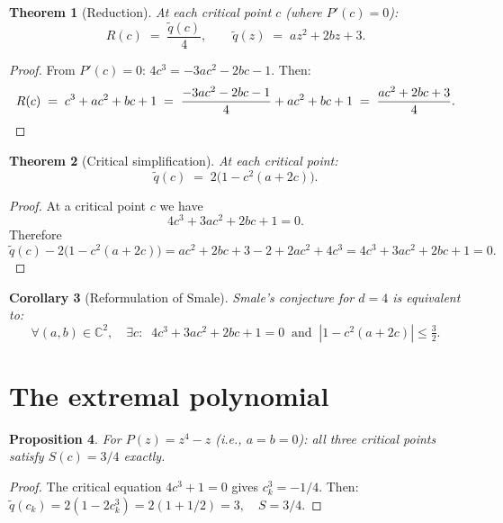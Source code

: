 \documentclass[11pt,a4paper]{article}
\newtheorem{theorem}{Theorem}[section]
\newtheorem{proposition}[theorem]{Proposition}
\newtheorem{corollary}[theorem]{Corollary}
\begin{document}
\begin{theorem}[Reduction]\label{thm:reduction}
At each critical point $c$ (where $P'(c) = 0$):
\begin{equation}
\boxed{R(c) \;=\; \frac{\tilde{q}(c)}{4}, \qquad \tilde{q}(z) \;=\; az^2 + 2bz + 3.}
\end{equation}
\end{theorem}

\begin{proof}
From $P'(c) = 0$: $4c^3 = -3ac^2 - 2bc - 1$. Then:
\begin{equation*}
R(c) \;=\; c^3 + ac^2 + bc + 1 \;=\; \frac{-3ac^2 - 2bc - 1}{4} + ac^2 + bc + 1 \;=\; \frac{ac^2 + 2bc + 3}{4}. \qedhere
\end{equation*}
\end{proof}

\begin{theorem}[Critical simplification]
At each critical point:
\begin{equation}
\tilde{q}(c) \;=\; 2\bigl(1 - c^2(a + 2c)\bigr).
\end{equation}
\end{theorem}

\begin{proof}
At a critical point $c$ we have
\[
4c^3+3ac^2+2bc+1=0.
\]
Therefore
\[
\tilde q(c)-2\bigl(1-c^2(a+2c)\bigr)
=ac^2+2bc+3-2+2ac^2+4c^3
=4c^3+3ac^2+2bc+1=0.
\]
\end{proof}

\begin{corollary}[Reformulation of Smale]
Smale's conjecture for $d = 4$ is equivalent to:
\begin{equation}
\forall (a, b) \in \mathbb{C}^2, \quad \exists c: \;\; 4c^3 + 3ac^2 + 2bc + 1 = 0 \;\; \text{and} \;\; |1 - c^2(a + 2c)| \le \tfrac{3}{2}.
\end{equation}
\end{corollary}

\section{The extremal polynomial}

\begin{proposition}
For $P(z) = z^4 - z$ (i.e., $a = b = 0$): all three critical points satisfy $S(c) = 3/4$ exactly.
\end{proposition}

\begin{proof}
The critical equation $4c^3 + 1 = 0$ gives $c_k^3 = -1/4$. Then:
$\tilde{q}(c_k) = 2(1 - 2c_k^3) = 2(1 + 1/2) = 3, \quad S = 3/4.$ \qedhere
\end{proof}
\end{document}
